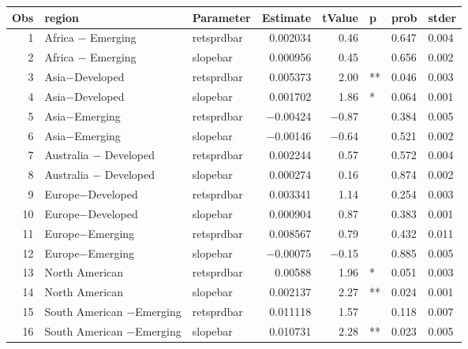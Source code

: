 

\begin{longtable}{|r|l|l|r|r|l|l|l|}\hline
   Obs &    region &    Parameter &    Estimate &    tValue &    p &    prob &    stder\\\hline
\endhead
   1 &    Africa $-$ Emerging &    retsprdbar &    0.002034 &    0.46 &      &    0.647 &    0.004\\\hline
   2 &    Africa $-$ Emerging &    slopebar &    0.000956 &    0.45 &      &    0.656 &    0.002\\\hline
   3 &    Asia$-$Developed &    retsprdbar &    0.005373 &    2.00 &    ** &    0.046 &    0.003\\\hline
   4 &    Asia$-$Developed &    slopebar &    0.001702 &    1.86 &    * &    0.064 &    0.001\\\hline
   5 &    Asia$-$Emerging &    retsprdbar &    $-$0.00424 &    $-$0.87 &      &    0.384 &    0.005\\\hline
   6 &    Asia$-$Emerging &    slopebar &    $-$0.00146 &    $-$0.64 &      &    0.521 &    0.002\\\hline
   7 &    Australia $-$ Developed &    retsprdbar &    0.002244 &    0.57 &      &    0.572 &    0.004\\\hline
   8 &    Australia $-$ Developed &    slopebar &    0.000274 &    0.16 &      &    0.874 &    0.002\\\hline
   9 &    Europe$-$Developed &    retsprdbar &    0.003341 &    1.14 &      &    0.254 &    0.003\\\hline
   10 &    Europe$-$Developed &    slopebar &    0.000904 &    0.87 &      &    0.383 &    0.001\\\hline
   11 &    Europe$-$Emerging &    retsprdbar &    0.008567 &    0.79 &      &    0.432 &    0.011\\\hline
   12 &    Europe$-$Emerging &    slopebar &    $-$0.00075 &    $-$0.15 &      &    0.885 &    0.005\\\hline
   13 &    North American &    retsprdbar &    0.00588 &    1.96 &    * &    0.051 &    0.003\\\hline
   14 &    North American &    slopebar &    0.002137 &    2.27 &    ** &    0.024 &    0.001\\\hline
   15 &    South American $-$Emerging &    retsprdbar &    0.011118 &    1.57 &      &    0.118 &    0.007\\\hline
   16 &    South American $-$Emerging &    slopebar &    0.010731 &    2.28 &    ** &    0.023 &    0.005\\\hline
\end{longtable}

